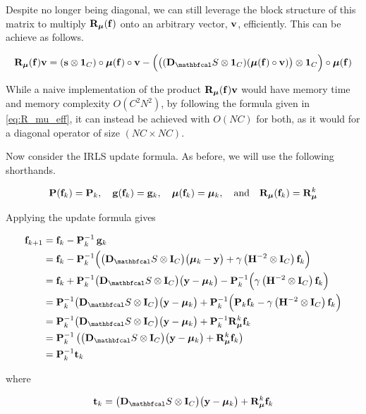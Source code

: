 Despite no longer being diagonal, we can still leverage the block structure of this matrix to multiply $\mathbf{R}_{\boldsymbol{\mu}}(\mathbf{f})$ onto an arbitrary vector, $\mathbf{v}$, efficiently. This can be achieve as follows. 


\begin{equation}
    \label{eq:R_mu_eff}
    \RR_{\muu}(\f) \ve = (\s \otimes \one_C) \circ  \muu(\f) \circ \ve - \Big(\big((\D_\St \otimes \one_C) (\muu(\f) \circ \ve) \big) \otimes \one_C \Big) \circ \muu(\f)
\end{equation}

While a naive implementation of the product $\mathbf{R}_{\boldsymbol{\mu}}(\mathbf{f}) \mathbf{v}$ would have memory time and memory complexity $O\left(C^2N^2\right)$, by following the formula given in \cref{eq:R_mu_eff}, it can instead be achieved with $O(NC)$ for both, as it would for a diagonal operator of size $(NC \times NC)$. 

Now consider the IRLS update formula. As before, we will use the following shorthands. 

\begin{equation*}
    \mathbf{P}(\mathbf{f}_k) = \mathbf{P}_k, \quad \mathbf{g}(\mathbf{f}_k) = \mathbf{g}_k, \quad \boldsymbol{\mu}(\mathbf{f}_k) = \boldsymbol{\mu}_k, \quad \text{and} \quad \mathbf{R}_{\boldsymbol{\mu}}(\mathbf{f}_k) = \mathbf{R}_{\boldsymbol{\mu}}^k
\end{equation*}

Applying the update formula gives

\begin{align*}
    \f_{k+1} &= \f_k - \PP^{-1}_k \, \g_k\\
    &= \f_{k} - \PP^{-1}_k \Big(\big(\D_\St \otimes \I_C\big) \big(\muu_k - \y\big) + \gamma \left(\HH^{-2} \otimes \I_C\right) \f_k\Big) \\
    &= \f_k + \PP^{-1}_k \big(\D_\St \otimes \I_C\big) \big(\y - \muu_k\big) - \PP^{-1}_k \Big(\gamma \left(\HH^{-2} \otimes \I_C\right) \f_k\Big) \\
    &= \PP^{-1}_k \big(\D_\St \otimes \I_C\big) \big(\y - \muu_k \big) + \PP^{-1}_k \Big(\PP_k \f_k - \gamma \left(\HH^{-2} \otimes \I_C\right) \f_k\Big) \\
    &= \PP^{-1}_k \big(\D_\St \otimes \I_C\big) \big(\y - \muu_k \big) + \PP^{-1}_k \RR_{\muu}^k\f_k  \\
    &= \PP^{-1}_k \left(\big(\D_\St \otimes \I_C\big)\big(\y - \muu_k \big) + \RR_{\muu}^k\f_k \right) \\
    &= \PP^{-1}_k \tee_k
\end{align*}

where 

\begin{equation*}
    \tee_k = \big(\D_\St \otimes \I_C\big)\big(\y - \muu_k \big) + \RR_{\muu}^k\f_k
\end{equation*}

